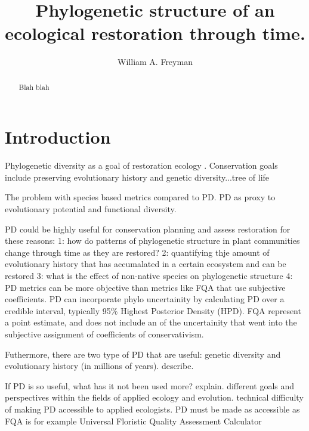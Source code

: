 \documentclass[twocolumn,superscriptaddress,showkeys]{revtex4}
\begin{document}
\title{Phylogenetic structure of an ecological restoration through time.}

\author{William A. Freyman}

\begin{abstract}
Blah blah
\end{abstract}


\maketitle


\section{Introduction}


Phylogenetic diversity as a goal of restoration ecology \cite{Hipp2015, Winter2013, rosauer2013, Verdu2012, Vane-Wright1991}.
Conservation goals include preserving evolutionary history and genetic diversity...tree of life


The problem with species based metrics compared to PD. PD as proxy to evolutionary potential and functional diversity.


PD could be highly useful for conservation planning and assess restoration for these reasons:
1: how do patterns of phylogenetic structure in plant communities change through time as they are restored?
2: quantifying thje amount of evolutionary history that has accumalated in a certain ecosystem and can be restored
3: what is the effect of non-native species on phylogenetic structure
4: PD metrics can be more objective than metrics like FQA that use subjective coefficients. 
PD can incorporate phylo uncertainity by calculating PD over a credible interval, typically 95\% Highest Posterior Density (HPD).
FQA represent a point estimate, and does not include an of the uncertainity that went into the subjective assignment of coefficients of conservativism.


Futhermore, there are two type of PD that are useful: genetic diversity and evolutionary history (in millions of years).
describe.


If PD is so useful, what has it not been used more? explain.
different goals and perspectives within the fields of applied ecology and evolution.
technical difficulty of making PD accessible to applied ecologists.
PD must be made as accessible as FQA is for example Universal Floristic Quality Assessment Calculator \cite{Freyman2013}
\end{document}
